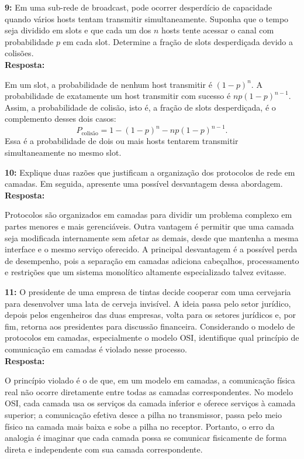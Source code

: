 \documentclass[12pt,a4paper]{report}
\begin{document}
\vspace{0.6cm}

\noindent \textbf{9:} Em uma sub-rede de broadcast, pode ocorrer desperdício de capacidade quando vários hosts tentam transmitir simultaneamente. Suponha que o tempo seja dividido em slots e que cada um dos \(n\) hosts tente acessar o canal com probabilidade \(p\) em cada slot. Determine a fração de slots desperdiçada devido a colisões. \\
\textbf{Resposta:}

Em um slot, a probabilidade de nenhum host transmitir é \((1-p)^n\). A probabilidade de exatamente um host transmitir com sucesso é \(np(1-p)^{n-1}\). Assim, a probabilidade de colisão, isto é, a fração de slots desperdiçada, é o complemento desses dois casos:
\[
    P_{\text{colisão}}=1-(1-p)^n-np(1-p)^{n-1}.
\]
Essa é a probabilidade de dois ou mais hosts tentarem transmitir simultaneamente no mesmo slot.

\vspace{0.6cm}

\noindent \textbf{10:} Explique duas razões que justificam a organização dos protocolos de rede em camadas. Em seguida, apresente uma possível desvantagem dessa abordagem. \\
\textbf{Resposta:}

Protocolos são organizados em camadas para dividir um problema complexo em partes menores e mais gerenciáveis. Outra vantagem é permitir que uma camada seja modificada internamente sem afetar as demais, desde que mantenha a mesma interface e o mesmo serviço oferecido. A principal desvantagem é a possível perda de desempenho, pois a separação em camadas adiciona cabeçalhos, processamento e restrições que um sistema monolítico altamente especializado talvez evitasse.

\vspace{0.6cm}

\noindent \textbf{11:} O presidente de uma empresa de tintas decide cooperar com uma cervejaria para desenvolver uma lata de cerveja invisível. A ideia passa pelo setor jurídico, depois pelos engenheiros das duas empresas, volta para os setores jurídicos e, por fim, retorna aos presidentes para discussão financeira. Considerando o modelo de protocolos em camadas, especialmente o modelo OSI, identifique qual princípio de comunicação em camadas é violado nesse processo. \\
\textbf{Resposta:}

O princípio violado é o de que, em um modelo em camadas, a comunicação física real não ocorre diretamente entre todas as camadas correspondentes. No modelo OSI, cada camada usa os serviços da camada inferior e oferece serviços à camada superior; a comunicação efetiva desce a pilha no transmissor, passa pelo meio físico na camada mais baixa e sobe a pilha no receptor. Portanto, o erro da analogia é imaginar que cada camada possa se comunicar fisicamente de forma direta e independente com sua camada correspondente.
\end{document}
